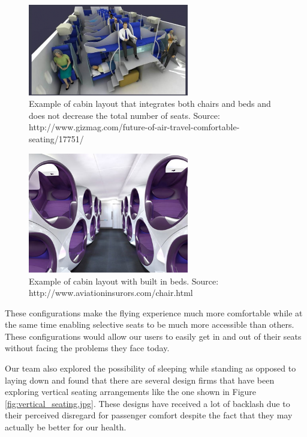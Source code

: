 \begin{figure}[h]
  \centering
     \includegraphics[width=7cm]{images/blue_vertical_configuration.png}
   \caption{Example of cabin layout that integrates both chairs and beds and does not decrease the total number of seats. Source: http://www.gizmag.com/future-of-air-travel-comfortable-seating/17751/}
  \label{fig:blue_vertical_configuration.png}
\end{figure} 

\begin{figure}[h]
  \centering
     \includegraphics[width=7cm]{images/purple_vertical_configuration.jpg}
   \caption{Example of cabin layout with built in beds. Source: http://www.aviationinsurors.com/chair.html}
  \label{fig:purple_vertical_configuration.png}
\end{figure} 

These configurations make the flying experience much more comfortable while at the same time enabling selective seats to be much more accessible than others. These configurations would allow our users to easily get in and out of their seats without facing the problems they face today.

Our team also explored the possibility of sleeping while standing as opposed to laying down and found that there are several design firms that have been exploring vertical seating arrangements like the one shown in Figure \ref{fig:vertical_seating.jpg}. These designs have received a lot of backlash due to their perceived disregard for passenger comfort despite the fact that they may actually be better for our health. 

